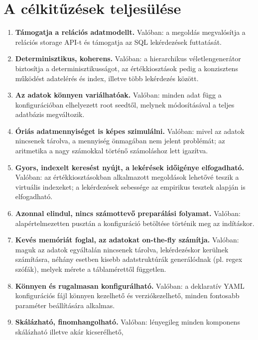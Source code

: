 \documentclass[
    parspace,
    noindent,
    nohyp,
]{elteiktdk}[2023/04/10]
\begin{document}
\section{A célkitűzések teljesülése}

\begin{enumerate}
    \setlength\itemsep{-0.5em}
    \item \textbf{Támogatja a relációs adatmodellt.} Valóban:
          a megoldás megvalósítja a relációs storage API-t és
          támogatja az SQL lekérdezések futtatását.
    \item \textbf{Determinisztikus, koherens.} Valóban:
          a hierarchikus véletlengenerátor biztosítja a determinisztikusságot,
          az értékkiosztások pedig a konzisztens működést adatelérés és index,
          illetve több lekérdezés között.
    \item \textbf{Az adatok könnyen variálhatóak.} Valóban:
          minden adat függ a konfigurációban elhelyezett root seedtől,
          melynek módosításával a teljes adatbázis megváltozik.
    \item \textbf{Óriás adatmennyiséget is képes szimulálni.} Valóban:
          mivel az adatok nincsenek tárolva, a mennyiség önmagában nem jelent problémát;
          az aritmetika a nagy számokkal történő számoláshoz lett igazítva.
    \item \textbf{Gyors, indexelt keresést nyújt, a lekérések időigénye elfogadható.} Valóban:
          az értékkiosztásokban alkalmazott megoldások lehetővé teszik a virtuális indexeket;
          a lekérdezések sebessége az empirikus tesztek alapján is elfogadható.
    \item \textbf{Azonnal elindul, nincs számottevő preparálási folyamat.} Valóban:
          alapértelmezetten pusztán a konfiguráció betöltése történik meg az indításkor.
    \item \textbf{Kevés memóriát foglal, az adatokat on-the-fly számítja.} Valóban:
          maguk az adatok egyáltalán nincsenek tárolva, lekérdezéskor kerülnek számításra,
          néhány esetben kisebb adatstruktúrák generálódnak (pl. regex szófák),
          melyek mérete a táblamérettől független.
    \item \textbf{Könnyen és rugalmasan konfigurálható.} Valóban:
          a deklaratív YAML konfigurációs fájl könnyen kezelhető és verziókezelhető,
          minden fontosabb paraméter beállítására alkalmas.
    \item \textbf{Skálázható, finomhangolható.} Valóban:
          lényegileg minden komponens skálázható illetve akár kicserélhető,

\end{enumerate}
\end{document}
